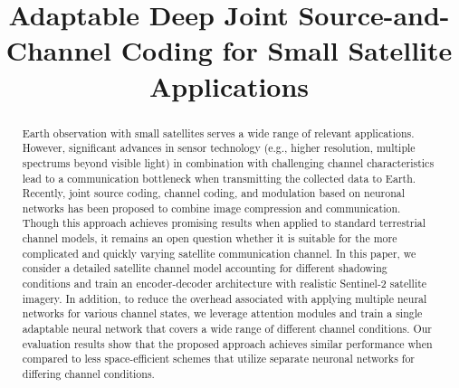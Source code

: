 \documentclass[conference]{IEEEtran}
\newcommand\sentinelii{Sentinel-2\xspace}
\begin{document}
\title{Adaptable Deep Joint Source-and-Channel Coding for Small Satellite Applications}

\author{
\and
{}
\and
{}
}

\maketitle

\begin{abstract}
Earth observation with small satellites serves a wide range of relevant applications.
However, significant advances in sensor technology (e.g., higher resolution, multiple spectrums beyond visible light) in combination with challenging channel characteristics lead to a communication bottleneck 
when transmitting the collected data to Earth.
Recently, joint source coding, channel coding, and modulation based on neuronal networks has been proposed to combine image compression and communication.
Though this approach achieves promising results when applied to standard terrestrial channel models, 
it remains an open question whether it is suitable for the more complicated and quickly varying satellite communication channel. 
In this paper, we consider a detailed satellite channel model accounting for different shadowing conditions and train an encoder-decoder architecture with realistic \sentinelii satellite imagery.
In addition, to reduce the overhead associated with applying multiple neural networks for various channel states, 
we leverage attention modules and train a single adaptable neural network that covers a wide range of different channel conditions.
Our evaluation results show that the proposed approach achieves similar performance when compared to less space-efficient schemes that utilize separate neuronal networks for differing channel conditions.   
\end{abstract}
\end{document}
